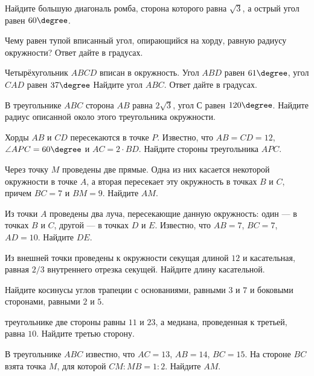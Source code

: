 \begin{class}[number=8]
	\begin{listofex}
		\item Найдите большую диагональ ромба, сторона которого равна \( \sqrt{3} \), а острый угол равен \( 60\degree \).
		\item Чему равен тупой вписанный угол, опирающийся на хорду, равную радиусу окружности? Ответ дайте в градусах.
		\item Четырёхугольник \( ABCD \) вписан в окружность. Угол \( ABD \) равен \( 61\degree \), угол \( CAD \) равен \( 37\degree \) Найдите угол \( ABC \). Ответ дайте в градусах.
		\item В треугольнике \( ABC \) сторона \( AB \) равна \( 2\sqrt{3} \), угол \( С \) равен \( 120\degree \). Найдите радиус описанной около этого треугольника окружности.
		\item Хорды \( AB \) и \( CD \) пересекаются в точке \( P \).
		Известно, что \( AB = CD = 12 \), \( \angle APC = 60\degree\) и \( AC = 2 \cdot BD \).
		Найдите стороны треугольника \( APC \).
		\item Через точку \( M \) проведены две прямые.
		Одна из них касается некоторой окружности в точке \( A \),
		а вторая пересекает эту окружность в точках \( B \) и \( C \),
		причем \( BC = 7 \) и \( BM = 9 \).
		Найдите \( AM \).
		\item Из точки \( A \) проведены два луча, пересекающие данную
		окружность: один --- в точках \( B \) и \( C \), другой --- в точках \( D \) и \( E \).
		Известно, что \( AB = 7 \), \( BC = 7 \), \( AD = 10 \). Найдите \( DE \).
		\item Из внешней точки проведены к окружности секущая
		длиной \( 12 \) и касательная,
		равная \( 2/3 \) внутреннего отрезка секущей.
		Найдите длину касательной.
		\item Найдите косинусы углов трапеции с основаниями,
		равными \( 3 \) и \( 7 \) и боковыми сторонами, равными \( 2 \) и \( 5 \).
		\item треугольнике две стороны равны \( 11 \) и \( 23 \),
		а медиана, проведенная к третьей, равна \( 10 \).
		Найдите третью сторону.
		\item В треугольнике \( ABC \) известно, что \( AC = 13 \),
		\( AB = 14 \), \( BC = 15 \). На стороне \( BC \) взята точка \( M \),
		для которой \( CM : MB = 1 : 2 \). Найдите \( AM \).
	\end{listofex}
\end{class}
